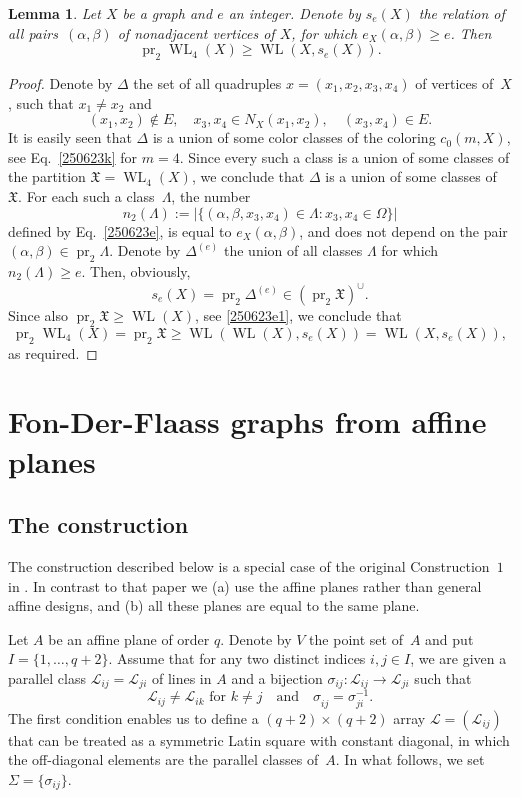 \documentclass{amsart}
\newcommand{\cal}{\mathcal}
\newtheorem{lemma}[formula]{Lemma}
\def\qtnl#1{\begin{equation}\label{#1}}
\def\eqtn{\end{equation}}
\def\lmml#1{\begin{lemma}\label{#1}}
\def\elmm{\end{lemma}}
\def\prf{\begin{proof}}
\def\eprf{\end{proof}}
\def\cL{{\cal L}}
\def\fX{{\mathfrak X}}
\DeclareMathOperator{\pr}{pr}
\DeclareMathOperator{\WL}{WL}
\def\qaq{\quad\text{and}\quad}
\begin{document}
\lmml{090623b}
Let $X$ be a graph  and $e$ an integer. Denote by $s_e(X)$ the relation  of all pairs~$(\alpha, \beta)$ of nonadjacent vertices of $X$, for which $e_X(\alpha,\beta)\ge e$. Then
$$
\pr_2\WL_4(X)\ge \WL(X, s_e(X)).
$$
\elmm
\prf
Denote by $\Delta$ the set of all quadruples $x=(x_1,x_2,x_3,x_4)$ 
of vertices of~$X$, such that $x_1\ne x_2$ and
$$
(x_1,x_2)\not\in E,\quad x_3,x_4\in N_X(x_1,x_2),\quad (x_3,x_4)\in E.
$$ 
It is easily seen that  $\Delta$ is a union of some color classes of the coloring $c_0(m,X)$, see Eq.~\eqref{250623k} for $m=4$. Since every such a class is a union of  some classes of the partition $\fX=\WL_4(X)$, we conclude that $\Delta$ is a union of some classes of~$\fX$.  For each such a class~$\Lambda$, the number 
$$
n_2(\Lambda):=|\{(\alpha,\beta,x_3,x_4)\in\Lambda\colon x_3,x_4\in\Omega\}|
$$
defined by Eq.~\eqref{250623e}, is equal to $e_X(\alpha,\beta)$, and does not depend on the pair $(\alpha,\beta)\in\pr_2 \Lambda$.  Denote by $\Delta^{(e)}$  the union of all classes $\Lambda$ for which $n_2(\Lambda)\ge e$. Then, obviously,
$$
s_e(X)=\pr_2\Delta^{(e)}\in (\pr_2\fX)^\cup.
$$
Since also  $\pr_2\fX\ge \WL(X)$, see \eqref{250623e1}, we conclude that
$$
\pr_2\WL_4(X)=\pr_2\fX\ge \WL(\WL(X),s_e(X))= \WL(X, s_e(X)),
$$
as required.
\eprf


\section{Fon-Der-Flaass graphs from affine planes }

\subsection{The construction}\label{130623h}
The construction described below is a special case of the original Construction~$1$ in \cite{FonDF2002}. In contrast to that paper we  (a) use the affine planes rather than general affine designs, and (b) all these planes are equal to the same plane. 

Let $A$ be an affine plane of order $q$. Denote by $V$ the point set of~$A$  and put $I=\{1,\ldots,q+2\}$. Assume that  for any two distinct indices  $i,j\in I$, we are given a parallel class $\cL_{ij}=\cL_{ji}$ of lines in $A$ and a bijection  $\sigma_{ij}\colon\cL_{ij}\to \cL_{ji}$ such that
\qtnl{140623a}
\cL_{ij}\ne \cL_{ik}\text{ for } k\ne j \qaq \sigma_{ij}^{}=\sigma_{ji}^{-1}.
\eqtn
The first condition enables us to define a $(q+2)\times (q+2)$ array $\cL=(\cL_{ij})$ that can be treated  as a  symmetric Latin square with constant diagonal, in which the off-diagonal elements  are the parallel classes of~$A$. In what follows, we set $\Sigma=\{\sigma_{ij}\}$.
\end{document}
